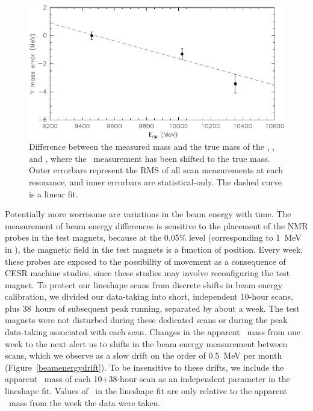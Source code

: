 \documentclass{cornell}
\begin{document}
\begin{figure}[p]
  \begin{center}
    \includegraphics[width=\linewidth]{plots/energycalibration}
  \end{center}
  \caption[Beam energy calibration as a function of
  \ecm]{\label{energycalibration} Difference between the measured mass
  and the true mass of the \us, \uss, and \usss, where the \us\
  measurement has been shifted to the true mass.  Outer errorbars
  represent the RMS of all scan measurements at each resonance, and
  inner errorbars are statistical-only.  The dashed curve is a linear
  fit.}
\end{figure}

Potentially more worrisome are variations in the beam energy with
time.  The measurement of beam energy differences is sensitive to the
placement of the NMR probes in the test magnets, because at the 0.05\%
level (corresponding to 1~MeV in \ecm), the magnetic field in the test
magnets is a function of position.  Every week, these probes are
exposed to the possibility of movement as a consequence of CESR
machine studies, since these studies may involve reconfiguring the
test magnet.  To protect our lineshape scans from discrete shifts in
beam energy calibration, we divided our data-taking into short,
independent 10-hour scans, plus 38~hours of subsequent peak running,
separated by about a week.  The test magnets were not disturbed during
these dedicated scans or during the peak data-taking associated with
each scan.  Changes in the apparent \ups\ mass from one week to the
next alert us to shifts in the beam energy measurement between scans,
which we observe as a slow drift on the order of 0.5~MeV per month
(Figure~\ref{beamenergydrift}).  To be insensitive to these drifts, we
include the apparent \ups\ mass of each 10+38-hour scan as an
independent parameter in the lineshape fit. \label{pag:massfloats}
Values of \ecm\ in the lineshape fit are only relative to the apparent
\ups\ mass from the week the data were taken.
\end{document}
